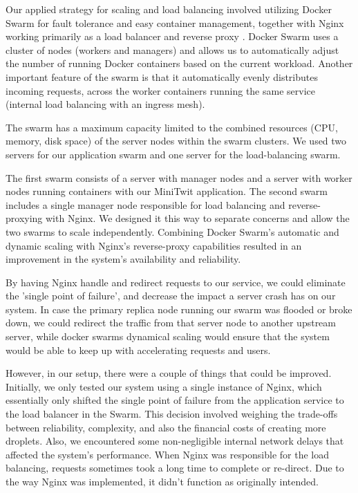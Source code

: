 Our applied strategy for scaling and load balancing involved utilizing Docker Swarm for fault tolerance and easy container management, together with Nginx working primarily as a load balancer and reverse proxy \autocite{docker-swarm, nginx}. Docker Swarm uses a cluster of nodes (workers and managers) and allows us to automatically adjust the number of running Docker containers based on the current workload. Another important feature of the swarm is that it automatically evenly distributes incoming requests, across the worker containers running the same service (internal load balancing with an ingress mesh).

The swarm has a maximum capacity limited to the combined resources (CPU, memory, disk space) of the server nodes within the swarm clusters. We used two servers for our application swarm and one server for the load-balancing swarm.

The first swarm consists of a server with manager nodes and a server with worker nodes running containers with our MiniTwit application. The second swarm includes a single manager node responsible for load balancing and reverse-proxying with Nginx. We designed it this way to separate concerns and allow the two swarms to scale independently. Combining Docker Swarm's automatic and dynamic scaling with Nginx's reverse-proxy capabilities resulted in an improvement in the system's availability and reliability.

By having Nginx handle and redirect requests to our service, we could eliminate the 'single point of failure', and decrease the impact a server crash has on our system. In case the primary replica node running our swarm was flooded or broke down, we could redirect the traffic from that server node to another upstream server, while docker swarms dynamical scaling would ensure that the system would be able to keep up with accelerating requests and users.

However, in our setup, there were a couple of things that could be improved.
Initially, we only tested our system using a single instance of Nginx, which essentially only shifted the single point of failure from the application service to the load balancer in the Swarm. This decision involved weighing the trade-offs between reliability, complexity, and also the financial costs of creating more droplets.
Also, we encountered some non-negligible internal network delays that affected the system's performance. When Nginx was responsible for the load balancing, requests sometimes took a long time to complete or re-direct. Due to the way Nginx was implemented, it didn't function as originally intended.


